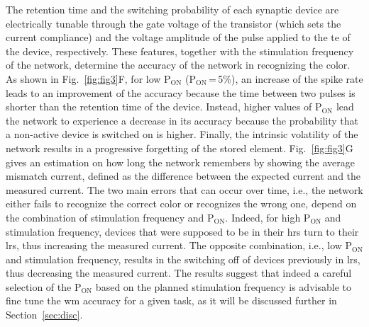 The retention time and the switching probability of each synaptic device are electrically tunable through the gate voltage of the transistor (which sets the current compliance) and the voltage amplitude of the pulse applied to the \gls{te} of the device, respectively. These features, together with the stimulation frequency of the network, determine the accuracy of the network in recognizing the color. As shown in Fig.~\ref{fig:fig3}F, for low P$\mathrm{_{ON}}$ (P$\mathrm{_{ON}}$\,=\,5\%), an increase of the spike rate leads to an improvement of the accuracy because the time between two pulses is shorter than the retention time of the device. Instead, higher values of P$\mathrm{_{ON}}$ lead the network to experience a decrease in its accuracy because the probability that a non-active device is switched on is higher. Finally, the intrinsic volatility of the network results in a progressive forgetting of the stored element. Fig.~\ref{fig:fig3}G gives an estimation on how long the network remembers by showing the average mismatch current, defined as the difference between the expected current and the measured current. The two main errors that can occur over time, i.e., the network either fails to recognize the correct color or recognizes the wrong one, depend on the combination of stimulation frequency and P$\mathrm{_{ON}}$. Indeed, for high P$\mathrm{_{ON}}$ and stimulation frequency, devices that were supposed to be in their \gls{hrs} turn to their \gls{lrs}, thus increasing the measured current. The opposite combination, i.e., low P$\mathrm{_{ON}}$ and stimulation frequency, results in the switching off of devices previously in \gls{lrs}, thus decreasing the measured current. The results suggest that indeed a careful selection of the P$\mathrm{_{ON}}$ based on the planned stimulation frequency is advisable to fine tune the \gls{wm} accuracy for a given task, as it will be discussed further in Section~\ref{sec:disc}.
